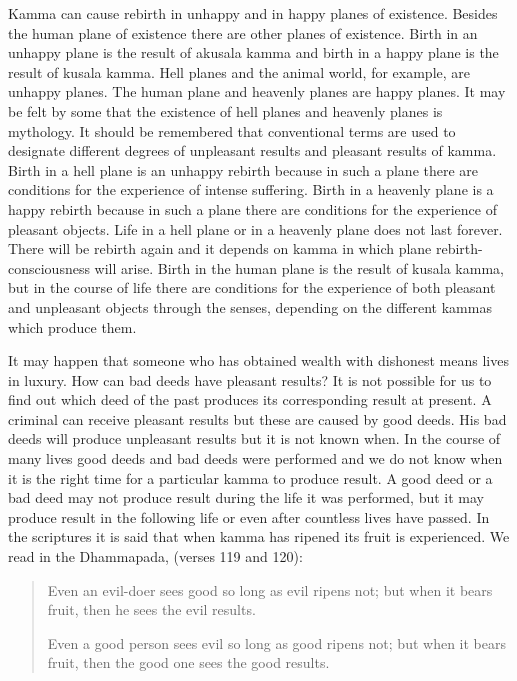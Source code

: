\documentclass{book}
\begin{document}
Kamma can cause rebirth in unhappy and in happy planes of existence.
Besides the human plane of existence there are other planes of
existence. Birth in an unhappy plane is the result of akusala kamma and
birth in a happy plane is the result of kusala kamma. Hell planes and
the animal world, for example, are unhappy planes. The human plane and
heavenly planes are happy planes. It may be felt by some that the
existence of hell planes and heavenly planes is mythology. It should be
remembered that conventional terms are used to designate different
degrees of unpleasant results and pleasant results of kamma. Birth in a
hell plane is an unhappy rebirth because in such a plane there are
conditions for the experience of intense suffering. Birth in a heavenly
plane is a happy rebirth because in such a plane there are conditions
for the experience of pleasant objects. Life in a hell plane or in a
heavenly plane does not last forever. There will be rebirth again and it
depends on kamma in which plane rebirth-consciousness will arise. Birth
in the human plane is the result of kusala kamma, but in the course of
life there are conditions for the experience of both pleasant and
unpleasant objects through the senses, depending on the different kammas
which produce them.

It may happen that someone who has obtained wealth with dishonest means
lives in luxury. How can bad deeds have pleasant results? It is not
possible for us to find out which deed of the past produces its
corresponding result at present. A criminal can receive pleasant results
but these are caused by good deeds. His bad deeds will produce
unpleasant results but it is not known when. In the course of many lives
good deeds and bad deeds were performed and we do not know when it is
the right time for a particular kamma to produce result. A good deed or
a bad deed may not produce result during the life it was performed, but
it may produce result in the following life or even after countless
lives have passed. In the scriptures it is said that when kamma has
ripened its fruit is experienced. We read in the Dhammapada, (verses 119
and 120):

\begin{quote}
Even an evil-doer sees good so long as evil ripens not; but when it
bears fruit, then he sees the evil results.

Even a good person sees evil so long as good ripens not; but when it
bears fruit, then the good one sees the good results.
\end{quote}
\end{document}
